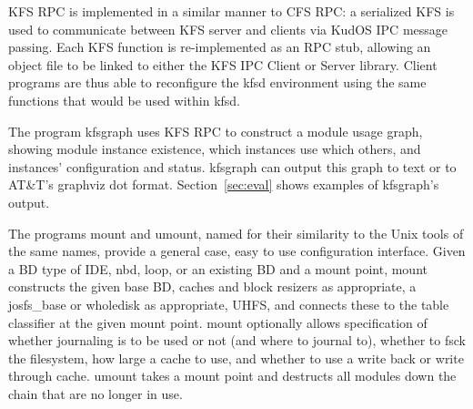 KFS RPC is implemented in a similar manner to CFS RPC: a serialized KFS is used
to communicate between KFS server and clients via KudOS IPC message passing.
Each KFS function is re-implemented as an RPC stub, allowing an object file to
be linked to either the KFS IPC Client or Server library. Client programs are
thus able to reconfigure the kfsd environment using the same functions that
would be used within kfsd.

The program kfsgraph uses KFS RPC to construct a module usage graph, showing
module instance existence, which instances use which others, and instances'
configuration and status. kfsgraph can output this graph to text or to AT\&T's
graphviz dot format. Section~\ref{sec:eval} shows examples of kfsgraph's output.

The programs mount and umount, named for their similarity to the Unix tools of
the same names, provide a general case, easy to use configuration interface.
Given a BD type of IDE, nbd, loop, or an existing BD and a mount point, mount
constructs the given base BD, caches and block resizers as appropriate, a
josfs\_base or wholedisk as appropriate, UHFS, and connects these to the table
classifier at the given mount point. mount optionally allows specification of
whether journaling is to be used or not (and where to journal to), whether to
fsck the filesystem, how large a cache to use, and whether to use a write back
or write through cache. umount takes a mount point and destructs all modules
down the chain that are no longer in use.
